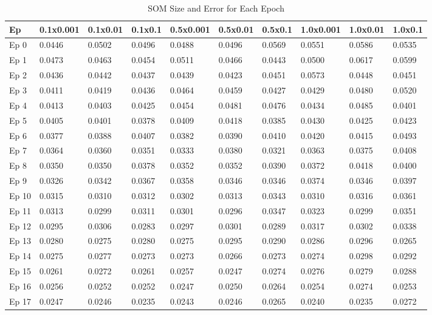 \begin{table}[htbp]
\centering
\caption{SOM Size and Error for Each Epoch}
\begin{tabular}{|l|l|l|l|l|l|l|l|l|l|}
\hline
Ep & 0.1x0.001 & 0.1x0.01 & 0.1x0.1 & 0.5x0.001 & 0.5x0.01 & 0.5x0.1 & 1.0x0.001 & 1.0x0.01 & 1.0x0.1 \\
\hline
Ep 0 & 0.0446 & 0.0502 & 0.0496 & 0.0488 & 0.0496 & 0.0569 & 0.0551 & 0.0586 & 0.0535  \\
Ep 1 & 0.0473 & 0.0463 & 0.0454 & 0.0511 & 0.0466 & 0.0443 & 0.0500 & 0.0617 & 0.0599  \\
Ep 2 & 0.0436 & 0.0442 & 0.0437 & 0.0439 & 0.0423 & 0.0451 & 0.0573 & 0.0448 & 0.0451  \\
Ep 3 & 0.0411 & 0.0419 & 0.0436 & 0.0464 & 0.0459 & 0.0427 & 0.0429 & 0.0480 & 0.0520  \\
Ep 4 & 0.0413 & 0.0403 & 0.0425 & 0.0454 & 0.0481 & 0.0476 & 0.0434 & 0.0485 & 0.0401  \\
Ep 5 & 0.0405 & 0.0401 & 0.0378 & 0.0409 & 0.0418 & 0.0385 & 0.0430 & 0.0425 & 0.0423  \\
Ep 6 & 0.0377 & 0.0388 & 0.0407 & 0.0382 & 0.0390 & 0.0410 & 0.0420 & 0.0415 & 0.0493  \\
Ep 7 & 0.0364 & 0.0360 & 0.0351 & 0.0333 & 0.0380 & 0.0321 & 0.0363 & 0.0375 & 0.0408  \\
Ep 8 & 0.0350 & 0.0350 & 0.0378 & 0.0352 & 0.0352 & 0.0390 & 0.0372 & 0.0418 & 0.0400  \\
Ep 9 & 0.0326 & 0.0342 & 0.0367 & 0.0358 & 0.0346 & 0.0346 & 0.0374 & 0.0346 & 0.0397  \\
Ep 10 & 0.0315 & 0.0310 & 0.0312 & 0.0302 & 0.0313 & 0.0343 & 0.0310 & 0.0316 & 0.0361  \\
Ep 11 & 0.0313 & 0.0299 & 0.0311 & 0.0301 & 0.0296 & 0.0347 & 0.0323 & 0.0299 & 0.0351  \\
Ep 12 & 0.0295 & 0.0306 & 0.0283 & 0.0297 & 0.0301 & 0.0289 & 0.0317 & 0.0302 & 0.0338  \\
Ep 13 & 0.0280 & 0.0275 & 0.0280 & 0.0275 & 0.0295 & 0.0290 & 0.0286 & 0.0296 & 0.0265  \\
Ep 14 & 0.0275 & 0.0277 & 0.0273 & 0.0273 & 0.0266 & 0.0273 & 0.0274 & 0.0298 & 0.0292  \\
Ep 15 & 0.0261 & 0.0272 & 0.0261 & 0.0257 & 0.0247 & 0.0274 & 0.0276 & 0.0279 & 0.0288  \\
Ep 16 & 0.0256 & 0.0252 & 0.0252 & 0.0247 & 0.0250 & 0.0264 & 0.0254 & 0.0274 & 0.0253  \\
Ep 17 & 0.0247 & 0.0246 & 0.0235 & 0.0243 & 0.0246 & 0.0265 & 0.0240 & 0.0235 & 0.0272  \\

\end{tabular}
\end{table}
